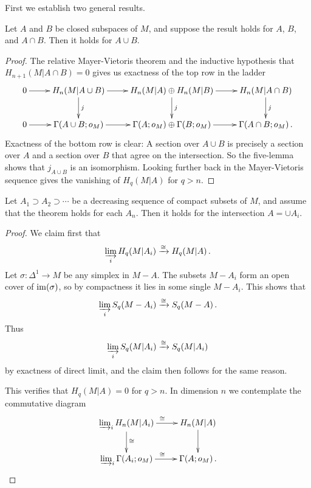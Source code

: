 First we establish two general results.
\begin{lemma} 
Let $A$ and $B$ be closed subspaces of $M$, and suppose the result
holds for $A$, $B$, and $A\cap B$. Then it holds for $A\cup B$.
\label{lem-mv}
\end{lemma}
\begin{proof}
The relative Mayer-Vietoris theorem and the inductive hypothesis that 
$H_{n+1}(M|A\cap B)=0$ gives us exactness of the top row in the ladder
\[
\xymatrix{
0 \ar[r] & H_n(M|A\cup B) \ar[d]^j \ar[r] & 
H_n(M|A)\oplus H_n(M|B) \ar[d]^j \ar[r] &
H_n(M|A\cap B) \ar[d]^j \\
0 \ar[r] & \Gamma(A\cup B;o_M) \ar[r] & 
\Gamma(A;o_M)\oplus\Gamma(B;o_M) \ar[r] &
\Gamma(A\cap B;o_M)\,.
}\]
Exactness of the bottom row is clear: A section over $A\cup B$ is precisely
a section over $A$ and a section over $B$ that agree on the intersection.
So the five-lemma shows that $j_{A\cup B}$ is an isomorphism. 
Looking further back in the Mayer-Vietoris sequence gives the vanishing of
$H_q(M|A)$ for $q>n$.  
\end{proof}
\begin{lemma} Let $A_1\supset A_2\supset\cdots$ be a decreasing sequence
of compact subsets of $M$, and assume that the theorem holds for each $A_n$.
Then it holds for the intersection $A=\cup A_i$. 
\label{lem-lim}
\end{lemma}
\begin{proof}
We claim first that 
\[
\varinjlim_iH_q(M|A_i)\xrightarrow{\cong}H_q(M|A)\,.
\]
Let $\sigma:\Delta^1\to M$ be any simplex in $M-A$. The subsets $M-A_i$
form an open cover of $\operatorname{im}(\sigma)$, so by compactness it lies in some
single $M-A_i$. This shows that 
\[
\varinjlim_iS_q(M-A_i)\xrightarrow{\cong}S_q(M-A)\,.
\]
Thus
\[
\varinjlim_iS_q(M|A_i)\xrightarrow{\cong}S_q(M|A_i)
\]
by exactness of direct limit, and the claim then follows for the same reason. 

This verifies that $H_q(M|A)=0$ for $q>n$. In dimension $n$ we contemplate
the commutative diagram 
\[
\xymatrix{
\varinjlim_iH_n(M|A_i) \ar[r]^\cong \ar[d]^\cong & H_n(M|A) \ar[d] \\
\varinjlim_i\Gamma(A_i;o_M) \ar[r]^\cong & \Gamma(A;o_M) \,.
}\]
\end{proof}


